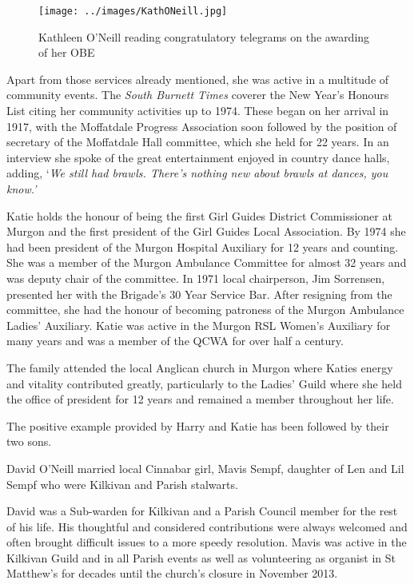 \begin{figure}
\begin{center}
\texttt{[image: ../images/KathONeill.jpg]}
\caption{Kathleen O'Neill reading congratulatory telegrams on the awarding of her OBE}
\end{center}
\end{figure}




Apart from those services already mentioned, she was active in a multitude of community events. The \emph{South Burnett Times} coverer the New Year's Honours List citing her community activities up to 1974. These began on her arrival in 1917, with the Moffatdale Progress Association soon followed by the position of secretary of the Moffatdale Hall committee, which she held for 22 years. In an interview she spoke of the great entertainment enjoyed in country dance halls, adding, `\emph{We still had brawls. There's nothing new about brawls at dances, you know.'}



Katie holds the honour of being the first Girl Guides District Commissioner at Murgon and the first president of the Girl Guides Local Association. By 1974 she had been president of the Murgon Hospital Auxiliary for 12 years and counting. She was a member of the Murgon Ambulance Committee for almost 32 years and was deputy chair of the committee. In 1971 local chairperson, Jim Sorrensen, presented her with the Brigade's 30 Year Service Bar. After resigning from the committee, she had the honour of becoming patroness of the Murgon Ambulance Ladies' Auxiliary. Katie was active in the Murgon RSL Women's Auxiliary for many years and was a member of the QCWA for over half a century.



The family attended the local Anglican church in Murgon where Katies energy and vitality contributed greatly, particularly to the Ladies' Guild where she held the office of president for 12 years and remained a member throughout her life.



The positive example provided by Harry and Katie has been followed by their two sons.



David O'Neill married local Cinnabar girl, Mavis Sempf, daughter of Len and Lil Sempf who were Kilkivan and Parish stalwarts.



David was a Sub-warden for Kilkivan and a Parish Council member for the rest of his life. His thoughtful and considered contributions were always welcomed and often brought difficult issues to a more speedy resolution. Mavis was active in the Kilkivan Guild and in all Parish events as well as volunteering as organist in St Matthew's for decades until the church's closure in November 2013.



